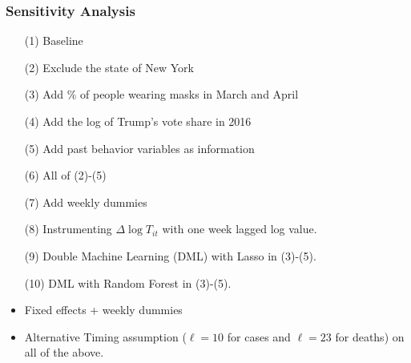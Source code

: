 \documentclass{beamer}
\begin{document}

\begin{frame}
  \frametitle{Sensitivity Analysis}
  

  \begin{itemize} 
  \item[(1)] Baseline
  \item[(2)]  Exclude  the state of New York
  \item[(3)]   Add \% of people wearing masks in March and April
   \item[(4)]   Add the log of Trump's vote share  in 2016
    \item[(5)]   Add  past behavior variables  as information
   \item[(6)]   All of (2)-(5)
   \item[(7)] Add weekly dummies
   \item[(8)] Instrumenting $\Delta \log T_{it}$ with one week lagged  log value.
   \item[(9)]   Double Machine Learning (DML) with Lasso in (3)-(5).    
    \item[(10)]  DML with Random Forest  in (3)-(5).      %
    \item Fixed effects + weekly dummies
    \item 
  Alternative Timing assumption ($\ell=10$ for cases and $\ell=23$ for deaths) on all of the above.
  \end{itemize}  
\end{frame}

\end{document}

